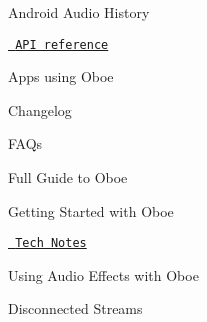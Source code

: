 
\begin{DoxyItemize}
\item Android Audio History
\item \href{https://google.github.io/oboe/reference/}{\texttt{ A\+PI reference}}
\item Apps using Oboe
\item Changelog
\item F\+A\+Qs
\item Full Guide to Oboe
\item Getting Started with Oboe
\item \href{notes/}{\texttt{ Tech Notes}}
\begin{DoxyItemize}
\item Using Audio Effects with Oboe
\item Disconnected Streams 
\end{DoxyItemize}
\end{DoxyItemize}